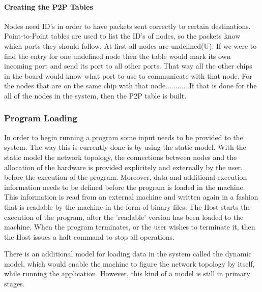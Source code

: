 \documentclass[12pt,a4paper]{article}
\begin{document}
\paragraph{Creating the P2P Tables}
Nodes need ID's in order to have packets sent correctly to certain destinations. Point-to-Point tables are used to list the ID's of nodes, so the packets know which ports they should follow. At first all nodes are undefined(U). If we were to find the entry for one undefined node then the table would mark its own incoming port and send its port to all other ports.  That way all the other chips in the board would know what port to use to communicate with that node. For the nodes that are on the same chip with that node............If that is done for the all of the nodes in the system, then the P2P table is built\cite{jefflec}. 

\subsubsection{Program Loading}
In order to begin running a program some input needs to be provided to the system. The way this is currently done is by using the static model. With the static model the network topology, the connections between nodes and the allocation of the hardware is provided explicitely and externally by the user, before the execution of the program. Moreover, data and additional execution information needs to be defined before the program is loaded in the machine. This information is read from an external machine and written again in a fashion that is readable by the machine in the form of binary files. The Host starts the execution of the program, after the 'readable' version has been loaded to the machine. When the program terminates, or the user wishes to terminate it, then the Host issues a halt command to stop all operations\cite{docfile}.

There is an additional model for loading data in the system called the dynamic model, which would enable the machine to figure the network topology by itself, while running the application. However, this kind of a model is still in primary stages\cite{docfile}.
\end{document}
